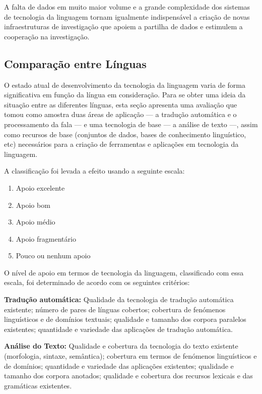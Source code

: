 \begin{multicols}{2}


A falta de dados em muito maior volume e a grande complexidade dos sistemas de tecnologia da linguagem 
tornam igualmente indispensável a criação de novas infraestruturas de investigação que apoiem 
a partilha de dados e estimulem a cooperação na investigação.




\subsection{Comparação entre Línguas}

 O estado atual de desenvolvimento da tecnologia da linguagem varia de forma significativa em função da língua em consideração. 
Para se obter uma ideia da situação entre as diferentes línguas, 
esta seção apresenta uma avaliação que tomou 
como amostra duas áreas de aplicação --- a tradução automática e o processamento da fala --- 
e uma tecnologia de base --- a análise de texto ---, assim como recursos de base (conjuntos
de dados, bases de conhecimento linguístico, etc) necessários 
para a criação de ferramentas e aplicações em tecnologia da linguagem.

A classificação foi levada a efeito usando a seguinte escala:

\begin{enumerate}
\item Apoio excelente 
\item Apoio bom
\item Apoio médio
\item Apoio fragmentário
\item Pouco ou nenhum apoio
\end{enumerate}

O nível de apoio em termos de tecnologia da linguagem, classificado com essa escala, 
foi determinado de acordo com os seguintes critérios:


\textbf{Tradução automática:} 
Qualidade da tecnologia de tradução automática existente; 
número de pares de línguas cobertos; 
cobertura de fenómenos linguísticos e de domínios textuais; 
qualidade e tamanho dos corpora paralelos existentes; 
quantidade e variedade das aplicações de tradução automática.

\textbf{Análise do Texto:} 
Qualidade e cobertura da tecnologia do texto existente (morfologia, sintaxe, semântica); 
cobertura em termos de fenómenos linguísticos e de domínios; 
quantidade e variedade das aplicações existentes; 
qualidade e tamanho dos corpora anotados;
qualidade e cobertura dos recursos lexicais e das gramáticas e\-xis\-ten\-tes.


\end{multicols}
